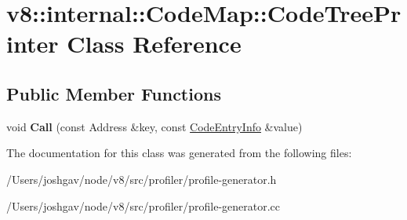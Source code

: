 \hypertarget{classv8_1_1internal_1_1_code_map_1_1_code_tree_printer}{}\section{v8\+:\+:internal\+:\+:Code\+Map\+:\+:Code\+Tree\+Printer Class Reference}
\label{classv8_1_1internal_1_1_code_map_1_1_code_tree_printer}
\subsection*{Public Member Functions}
\begin{DoxyCompactItemize}
\item 
void {\bfseries Call} (const Address \&key, const \hyperlink{structv8_1_1internal_1_1_code_map_1_1_code_entry_info}{Code\+Entry\+Info} \&value)\hypertarget{classv8_1_1internal_1_1_code_map_1_1_code_tree_printer_a0526b148ad1b214a85b737d4033a7e43}{}\label{classv8_1_1internal_1_1_code_map_1_1_code_tree_printer_a0526b148ad1b214a85b737d4033a7e43}

\end{DoxyCompactItemize}


The documentation for this class was generated from the following files\+:\begin{DoxyCompactItemize}
\item 
/\+Users/joshgav/node/v8/src/profiler/profile-\/generator.\+h\item 
/\+Users/joshgav/node/v8/src/profiler/profile-\/generator.\+cc\end{DoxyCompactItemize}
